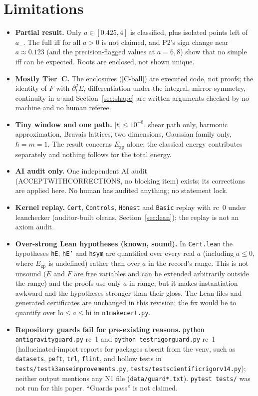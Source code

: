 \documentclass[10pt]{article}
\newcommand{\tCb}{\textcolor{blue!60!black}{\textsf{[C-ball]}}}
\newcommand{\lean}[1]{\texttt{#1}}
\renewcommand{\_}{\textunderscore\penalty0\hspace{0pt}}
\newcommand{\Ezp}{E_{\mathrm{zp}}}
\begin{document}
\section{Limitations}\label{sec:lim}
\begin{itemize}\itemsep=1pt
\item \textbf{Partial result.} Only $a\in[0.425,4]$ is classified, plus isolated points left of $a_-$. The full iff for all $a>0$ is not claimed, and P2's sign change near $a\approx0.123$ (and the precision-flagged values at $a=6,8$) show that no simple iff can be expected. Roots are enclosed, not shown unique.
\item \textbf{Mostly Tier~C.} The enclosures (\tCb) are executed code, not proofs; the identity of $F$ with $\partial_t^2E$, differentiation under the integral, mirror symmetry, continuity in $a$ and Section~\ref{sec:shape} are written arguments checked by no machine and no human referee.
\item \textbf{Tiny window and one path.} $|t|\le10^{-8}$, shear path only, harmonic approximation, Bravais lattices, two dimensions, Gaussian family only, $\hbar=m=1$. The result concerns $\Ezp$ alone; the classical energy contributes separately and nothing follows for the total energy.
\item \textbf{AI audit only.} One independent AI audit (ACCEPT\_WITH\_CORRECTIONS, no blocking item) exists; its corrections are applied here. No human has audited anything; no statement lock.
\item \textbf{Kernel replay.} \lean{Cert}, \lean{Controls}, \lean{Honest} and \lean{Basic} replay with rc~0 under leanchecker (auditor-built oleans, Section~\ref{sec:lean}); the replay is not an axiom audit.
\item \textbf{Over-strong Lean hypotheses (known, sound).} In \texttt{Cert.lean} the hypotheses \lean{hE}, \lean{hE'} and \lean{hsym} are quantified over every real $a$ (including $a\le0$, where $\Ezp$ is undefined) rather than over $a$ in the record's range. This is not unsound ($E$ and $F$ are free variables and can be extended arbitrarily outside the range) and the proofs use only $a$ in range, but it makes instantiation awkward and the hypotheses stronger than their gloss. The Lean files and generated certificates are unchanged in this revision; the fix would be to quantify over $\mathrm{lo}\le a\le \mathrm{hi}$ in \texttt{n1\_make\_cert.py}.
\item \textbf{Repository guards fail for pre-existing reasons.} \texttt{python antigravity\_guard.py} rc~1 and \texttt{python test\_rigor\_guard.py} rc~1 (hallucinated-import reports for packages absent from the venv, such as \texttt{datasets}, \texttt{peft}, \texttt{trl}, \texttt{flint}, and hollow tests in \texttt{tests/test\_k3\_anse\_improvements.py}, \texttt{tests/test\_scientific\_rigor\_v14.py}); neither output mentions any N1 file (\texttt{data/guard\_*.txt}). \texttt{pytest tests/} was not run for this paper. ``Guards pass'' is not claimed.

\end{itemize}
\end{document}
